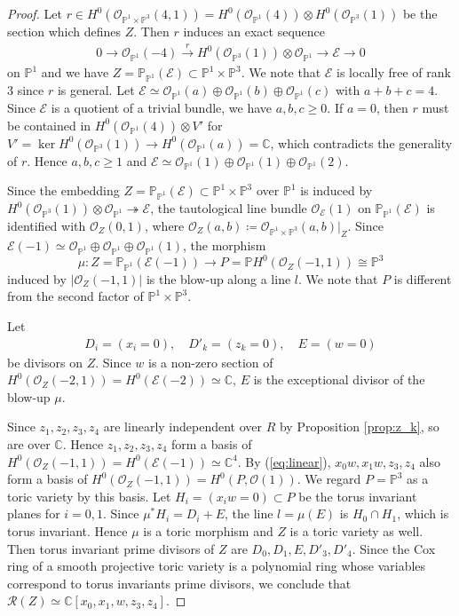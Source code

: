\documentclass[10pt,a4paper]{amsart}
\newcommand{\C}{\mathbb{C}}
\newcommand{\Ox}{\mathcal{O}}
\newcommand{\R}{\mathcal{R}}
\newcommand{\p}{\mathbb{P}}
\begin{document}
\begin{proof}
Let $r \in H^0(\Ox_{\p^1 \times \p^3}(4,1)) =H^0(\Ox_{\p^1}(4)) \otimes H^0( \Ox_{\p^3}(1)) $ be the section which defines $Z$.
Then $r$ induces an exact sequence
\begin{align*}
0 \to \Ox_{\p^1}(-4) \xrightarrow{r} H^0( \Ox_{\p^3}(1)) \otimes \Ox_{\p^1} \to \mathcal{E} \to 0
\end{align*}
on $\p^1$
and we have $Z =\p_{\p^1}(\mathcal{E})\subset \p^1 \times \p^3$.
We note that $\mathcal{E}$ is locally free of rank $3$
since $r$ is general.
Let $\mathcal{E} \simeq \Ox_{\p^1} (a) \oplus \Ox_{\p^1} (b) \oplus \Ox_{\p^1} (c)$ with $a+b+c=4$.
Since $\mathcal{E}$ is a quotient of a trivial bundle, we have $a,b,c \geq 0$.
If $a =0$, then $r$ must be contained in $H^0(\Ox_{\p^1}(4)) \otimes V'$ for
$V' =\ker H^0(\Ox_{\p^3}(1)) \to H^0(\Ox_{\p^1}(a))=\C$,
which contradicts the generality of $r$.
Hence $a,b,c \geq 1$ and $\mathcal{E} \simeq  \Ox_{\p^1} (1) \oplus \Ox_{\p^1} (1) \oplus \Ox_{\p^1} (2)$. 


Since the embedding $Z =\p_{\p^1}(\mathcal{E})\subset \p^1 \times \p^3$ over $\p^1$ is induced by 
$H^0( \Ox_{\p^3}(1)) \otimes \Ox_{\p^1} \twoheadrightarrow \mathcal{E} $,
the tautological line bundle $\Ox_{\mathcal{E}}(1)$ on $ \p_{\p^1}(\mathcal{E})$ is identified with $\Ox_Z(0,1)$,
where $\Ox_Z(a,b) \coloneqq \Ox_{\p^1\times \p^3}(a,b)|_Z $.
Since $\mathcal{E}(-1) \simeq 
\Ox_{\p^1} \oplus \Ox_{\p^1} \oplus \Ox_{\p^1} (1)$, 
the morphism 
\[\mu : Z=\p_{\p^1}(\mathcal{E}(-1)) \to P = \p H^0(\Ox_Z(-1,1)) \cong\p^3\]
induced by $|\Ox_Z(-1,1)|$ is the blow-up along a line $l$.
We note that $P$ is different from the second factor of $\p^1 \times \p^3$.


Let 
\begin{align*}
D_i =(x_i=0), \quad D'_k=(z_k =0), \quad E=(w=0) 
\end{align*}
be divisors on $Z$.
Since $w$ is a non-zero section of $H^0( \Ox_Z(-2,1)) = H^0(\mathcal{E}(-2)) \simeq \C$,
$E$ is the exceptional divisor of the blow-up $\mu$.

Since $z_1,z_2,z_3,z_4$ are linearly independent over $R$ by Proposition \ref{prop:z_k},
so are over $\C$.
Hence $z_1,z_2,z_3,z_4$ form a basis of $ H^0(\Ox_Z(-1,1))  =H^0(\mathcal{E}(-1)) \simeq \C^4$.
By (\ref{eq:linear}), $x_0w,x_1w,z_3,z_4$ also form a basis of $ H^0(\Ox_Z(-1,1)) =H^0(P, \Ox(1))$. We regard $P=\p^3$ as a toric variety by this basis.
Let $H_i=(x_iw=0) \subset P$ be the torus invariant planes for $i=0,1$.
Since $\mu^*H_i=D_i+E$, the line $l =\mu(E)$ is $H_0 \cap H_1$, which is torus invariant.
Hence $\mu$ is a toric morphism and $Z$ is a toric variety as well.
Then torus invariant prime divisors of $Z$ are $D_0,D_1,E, D'_3,D'_4$.
Since the Cox ring of a smooth projective toric variety is a polynomial ring whose variables correspond to torus invariants prime divisors,
we conclude that $\R(Z) \simeq \C[x_0,x_1,w,z_3,z_4]$.
\end{proof}
\end{document}
